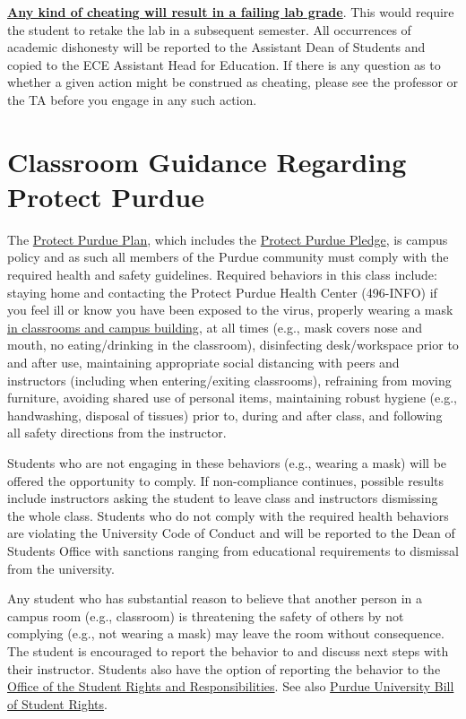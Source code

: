 \documentclass[letterpaper, 11pt]{article}
\begin{document}
\noindent
\textbf{\underline{Any kind of cheating will result in a failing lab grade}}. This would require the student to retake the lab in a subsequent semester. All occurrences of academic dishonesty will be reported to the Assistant Dean of Students and copied to the ECE Assistant Head for Education. If there is any question as to whether a given action might be construed as cheating, please see the professor or the TA before you engage in any such action.

\section*{Classroom Guidance Regarding Protect Purdue}

The \href{https://protect.purdue.edu/plan/}{Protect Purdue Plan}, which includes the \href{https://protect.purdue.edu/pledge/?_ga=2.210401429.1213937682.1590527202-1814553957.1589408073}{Protect Purdue Pledge}, is campus policy and as such all members of the Purdue community must comply with the required health and safety guidelines. Required behaviors in this class include: staying home and contacting the Protect Purdue Health Center (496-INFO) if you feel ill or know you have been exposed to the virus, properly wearing a mask \href{https://protect.purdue.edu/updates/face-covering-protocols/}{in classrooms and campus building}, at all times (e.g., mask covers nose and mouth, no eating/drinking in the classroom), disinfecting desk/workspace prior to and after use, maintaining appropriate social distancing with peers and instructors (including when entering/exiting classrooms), refraining from moving furniture, avoiding shared use of personal items, maintaining robust hygiene (e.g., handwashing, disposal of tissues) prior to, during and after class, and following all safety directions from the instructor.

Students who are not engaging in these behaviors (e.g., wearing a mask) will be offered the opportunity to comply. If non-compliance continues, possible results include instructors asking the student to leave class and instructors dismissing the whole class. Students who do not comply with the required health behaviors are violating the University Code of Conduct and will be reported to the Dean of Students Office with sanctions ranging from educational requirements to dismissal from the university.

Any student who has substantial reason to believe that another person in a campus room (e.g., classroom) is threatening the safety of others by not complying (e.g., not wearing a mask) may leave the room without consequence. The student is encouraged to report the behavior to and discuss next steps with their instructor. Students also have the option of reporting the behavior to the \href{https://www.purdue.edu/odos/osrr/}{Office of the Student Rights and Responsibilities}. See also \href{https://catalog.purdue.edu/content.php?catoid=7&navoid=2852#purdue-university-bill-of-student-rights}{Purdue University Bill of Student Rights}. 
\end{document}

